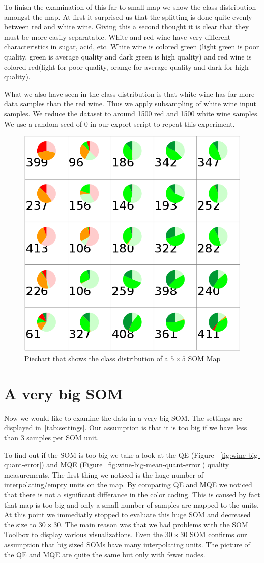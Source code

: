\documentclass{acm_proc_article-sp}
\begin{document}
To finish the examination of this far to small map we show the class distribution amongst the map.
At first it surprised us that the splitting is done quite evenly between red and
white wine. Giving this a second thought it is clear that they must be more easily separatable.
White and red wine have very different characteristics in sugar, acid, etc. 
White wine is colored green (light green is poor quality, green is average quality and dark green is high quality) and
red wine is colored red(light for poor quality, orange for average quality and dark for high quality).

What we also have seen in the class distribution is that white wine has far more data samples
than the red wine. Thus we apply subsampling of white wine input samples. We reduce the dataset to around 1500 red and 1500 white wine samples.
We use a random seed of 0 in our export script to repeat this experiment.

\begin{figure}
\centering
\includegraphics[width=0.5\linewidth]{img/wine-small-pie-cls}
\caption{Piechart that shows the class distribution of a $5\times5$ SOM Map}
\label{fig:wine-small-pie-cls}
\end{figure}

\section{A very big SOM}

Now we would like to examine the data in a very big SOM. The settings are displayed
in~\ref{tab:settings}. Our assumption is that it is too big if we have less than 3
samples per SOM unit.

To find out if the SOM is too big we take a look at the QE (Figure ~\ref{fig:wine-big-quant-error}) and MQE (Figure~\ref{fig:wine-big-mean-quant-error}) quality measurements.
The first thing we noticed is the huge number of interpolating/empty units on the map. By comparing QE and MQE we noticed that there is not
a significant differance in the color coding. This is caused by fact that map is too big and only a small number of samples
are mapped to the units.
At this point we immediatly stopped to evaluate this huge SOM and decreased the size to $30\times30$. The main reason was that we had problems
with the SOM Toolbox to display various visualizations. Even the $30\times30$ SOM confirms our assumption that big sized SOMs have
many interpolating units. The picture of the QE and MQE are quite the same but only with fewer nodes.
\end{document}
